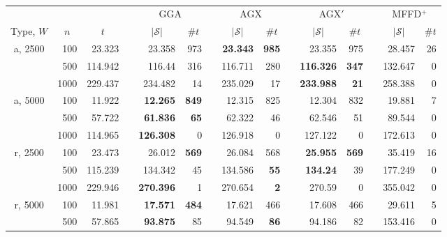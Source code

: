 \documentclass[authoryear]{elsarticle}
\begin{document}
\begin{table}[h!]
\centering
\caption{}
\small
\begin{threeparttable}
\begin{tabular}{crr c rr c rr c rr c rr}
	\toprule
	& & & & \multicolumn{2}{c}{GGA} &\phantom{a}& \multicolumn{2}{c}{AGX} &\phantom{a'}& \multicolumn{2}{c}{AGX$'$} &\phantom{a'}& \multicolumn{2}{c}{MFFD$^+$}\\
	\cmidrule{5-6} \cmidrule{8-9} \cmidrule{11-12} \cmidrule{14-15}
	\multicolumn{1}{c}{Type, $W$} & \multicolumn{1}{c}{$n$} & \multicolumn{1}{c}{$t$\tnote{$a$}} && \multicolumn{1}{c}{$|\mathcal{S}|$\tnote{$b$}} & \multicolumn{1}{c}{$\# t$\tnote{$c$}} && \multicolumn{1}{c}{$|\mathcal{S}|$} & \multicolumn{1}{c}{$\# t$} && \multicolumn{1}{c}{$|\mathcal{S}|$} & \multicolumn{1}{c}{$\# t$} && \multicolumn{1}{c}{$|\mathcal{S}|$} & \multicolumn{1}{c}{$\# t$}\\
	\midrule
	a, 2500 & 100 & 23.323 && 23.358 & 973 && \textbf{23.343} & \textbf{985} && 23.355 & 975 && 28.457 & 26\\
	& 500 & 114.942 && 116.44 & 316 && 116.711 & 280 && \textbf{116.326} &\textbf{347} && 132.647 & 0\\
	& 1000 & 229.437 && 234.482 & 14 && 235.029 & 17 && \textbf{233.988} &\textbf{21} && 258.388 & 0\\
	\midrule
	a, 5000 & 100 & 11.922 && \textbf{12.265} & \textbf{849} && 12.315 & 825 && 12.304 & 832 && 19.881 & 7\\
	& 500 & 57.722 && \textbf{61.836} & \textbf{65} && 62.322 & 46 && 62.546 & 51 && 89.544 & 0\\
	& 1000 & 114.965 && \textbf{126.308} & 0 && 126.918 & 0 && 127.122 & 0 && 172.613 & 0\\
	\midrule
	\midrule
	r, 2500 & 100 & 23.473 && 26.012 & \textbf{569} && 26.084 & 568 && \textbf{25.955} &\textbf{569} && 35.419 & 16\\
	& 500 & 115.239 && 134.342 & 45 && 134.586 & \textbf{55} && \textbf{134.24} & 39 && 177.249 & 0\\
	& 1000 & 229.946 && \textbf{270.396} & 1 && 270.654 & \textbf{2} && 270.59 & 0 && 355.042 & 0\\
	\midrule
	r, 5000 & 100 & 11.981 && \textbf{17.571} & \textbf{484} && 17.621 & 466 && 17.608 & 466 && 29.611 & 5\\
	& 500 & 57.865 && \textbf{93.875} & 85 && 94.549 & \textbf{86} && 94.186 & 82 && 153.416 & 0\\

\end{tabular}
\end{threeparttable}
\end{table}
\end{document}
